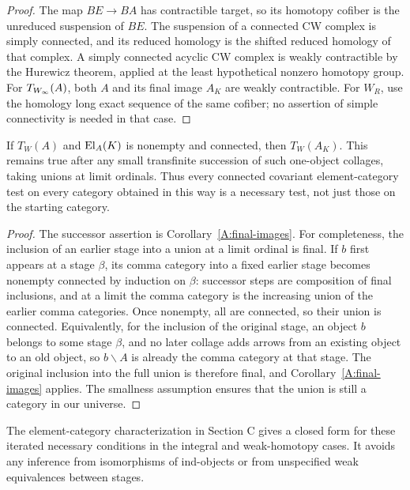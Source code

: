 \begin{proof}
The map $BE\to BA$ has contractible target, so its homotopy cofiber is the unreduced suspension of $BE$. The suspension of a connected CW complex is simply connected, and its reduced homology is the shifted reduced homology of that complex. A simply connected acyclic CW complex is weakly contractible by the Hurewicz theorem, applied at the least hypothetical nonzero homotopy group. For $T_{W_{\infty}}(A)$, both $A$ and its final image $A_K$ are weakly contractible. For $W_R$, use the homology long exact sequence of the same cofiber; no assertion of simple connectivity is needed in that case.
\end{proof}

\begin{proposition}\label{B:iteration}
If $T_W(A)$ and $\operatorname{El}_A(K)$ is nonempty and connected, then $T_W(A_K)$. This remains true after any small transfinite succession of such one-object collages, taking unions at limit ordinals. Thus every connected covariant element-category test on every category obtained in this way is a necessary test, not just those on the starting category.
\end{proposition}

\begin{proof}
The successor assertion is Corollary~\ref{A:final-images}. For completeness, the inclusion of an earlier stage into a union at a limit ordinal is final. If $b$ first appears at a stage $\beta$, its comma category into a fixed earlier stage becomes nonempty connected by induction on $\beta$: successor steps are composition of final inclusions, and at a limit the comma category is the increasing union of the earlier comma categories. Once nonempty, all are connected, so their union is connected. Equivalently, for the inclusion of the original stage, an object $b$ belongs to some stage $\beta$, and no later collage adds arrows from an existing object to an old object, so $b\backslash A$ is already the comma category at that stage. The original inclusion into the full union is therefore final, and Corollary~\ref{A:final-images} applies. The smallness assumption ensures that the union is still a category in our universe.
\end{proof}

The element-category characterization in Section C gives a closed form for these iterated necessary conditions in the integral and weak-homotopy cases. It avoids any inference from isomorphisms of ind-objects or from unspecified weak equivalences between stages.

